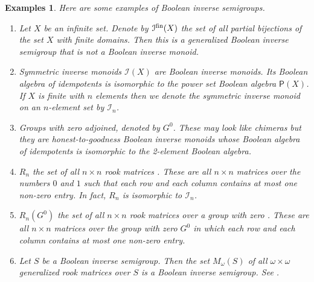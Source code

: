 \documentclass[a4paper]{amsart}
\newtheorem{lemma}[theorem]{Lemma}
\newtheorem{examples}[theorem]{Examples}
\begin{document}
\begin{examples}
{\em Here are some examples of Boolean inverse semigroups.
\begin{enumerate}

\item Let $X$ be an infinite set. Denote by $\mathcal{I}^{\rm fin}(X)$ the set of all partial bijections of the set $X$
with finite domains. Then this is a generalized Boolean inverse semigroup that is not a Boolean inverse monoid.

\item Symmetric inverse monoids $\mathcal{I}(X)$ are Boolean inverse monoids. Its Boolean algebra of idempotents 
is isomorphic to the power set Boolean algebra $\mathsf{P}(X)$. If $X$ is finite with $n$ elements then we denote the symmetric inverse monoid
on an $n$-element set by $\mathcal{I}_{n}$. 

\item Groups with zero adjoined, denoted by $G^{0}$. These may look like chimeras but they are honest-to-goodness Boolean inverse monoids
whose Boolean algebra of idempotents is isomorphic to the 2-element Boolean algebra.

\item $R_{n}$ the set of all $n \times n$ rook matrices \cite{Solomon}. These are all $n \times n$ matrices over the numbers $0$ and $1$ such that
each row and each column contains at most one non-zero entry.  In fact, $R_{n}$ is isomorphic to $\mathcal{I}_{n}$.

\item $R_{n}(G^{0})$ the set of all  $n \times n$ rook matrices over a group with zero \cite{Malandro}. These are all $n \times n$ matrices over the group with zero $G^{0}$
in which each row and each column contains at most one non-zero entry.

\item Let $S$ be a Boolean inverse semigroup.
Then the set $M_{\omega}(S)$ of all $\omega \times \omega$ generalized rook matrices over $S$ is a Boolean inverse semigroup.
See \cite{KLLR}.


\end{enumerate}
}
\end{examples}


\end{document}
